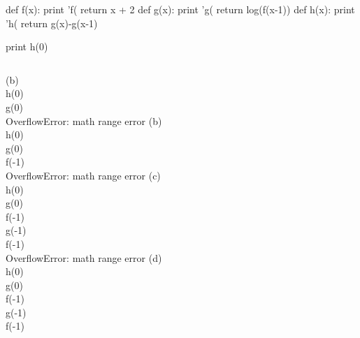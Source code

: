 \begin{frame}[fragile]
\begin{python}
def f(x):
    print 'f(%
    return x + 2
def g(x):
    print 'g(%
    return log(f(x-1))
def h(x):
    print 'h(%
    return g(x)-g(x-1)

print h(0)
\end{python}

\begin{columns}
(b)\\
h(0)\\
g(0)\\
OverflowError: math range error
(b)\\
h(0)\\
g(0)\\
f(-1)\\
OverflowError: math range error
(c)\\
h(0)\\
g(0)\\
f(-1)\\
g(-1)\\
f(-1)\\
OverflowError: math range error
(d)\\
h(0)\\
g(0)\\
f(-1)\\
g(-1)\\
f(-1)
\end{columns}
\end{frame}


